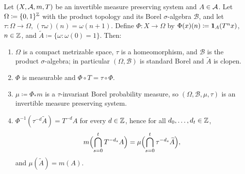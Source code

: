 \begin{lemma}
  \label{lem:symbolic-model}
  \leanok
  Let $(X,\mathcal{A},m,T)$ be an invertible measure preserving system and $A \in \mathcal{A}$.  Let
  $\Omega \coloneqq \{0,1\}^{\mathbb{Z}}$ with the product topology and its Borel $\sigma$-algebra
  $\mathcal B$, and let $\tau : \Omega \to \Omega$, $(\tau\omega)(n) = \omega(n+1)$.  Define
  $\Phi : X \to \Omega$ by $\Phi(x)(n) \coloneqq \mathbf{1}_A(T^nx)$, $n \in \mathbb{Z}$, and
  $\widetilde A \coloneqq \{\omega : \omega(0) = 1\}$.  Then:
  \begin{enumerate}
    \item[(i)] $\Omega$ is a compact metrizable space, $\tau$ is a homeomorphism, and
      $\mathcal B$ is the product $\sigma$-algebra; in particular $(\Omega,\mathcal B)$ is
      standard Borel and $\widetilde A$ is clopen.
    \item[(ii)] $\Phi$ is measurable and $\Phi \circ T = \tau \circ \Phi$.
    \item[(iii)] $\mu \coloneqq \Phi_\ast m$ is a $\tau$-invariant Borel probability measure,
      so $(\Omega,\mathcal B,\mu,\tau)$ is an invertible measure preserving system.
    \item[(iv)] $\Phi^{-1}(\tau^{-d}\widetilde A) = T^{-d}A$ for every $d \in \mathbb{Z}$, hence for all
      $d_0,\dots,d_t \in \mathbb{Z}$,
      \begin{equation}
        \label{eq:model}
        m\Bigl( \bigcap_{s=0}^{t} T^{-d_s}A \Bigr) = \mu\Bigl( \bigcap_{s=0}^{t} \tau^{-d_s}\widetilde A \Bigr) ,
      \end{equation}
      and $\mu(\widetilde A) = m(A)$.
  \end{enumerate}
\end{lemma}

